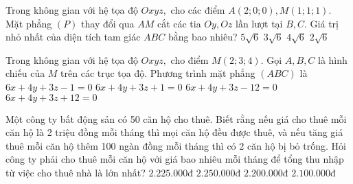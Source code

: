 \begin{ex}%
Trong không gian với hệ tọa độ $Oxyz,$ cho các điểm $A(2; 0; 0), M(1; 1; 1).$ Mặt phẳng $(P)$ thay đổi qua $AM$ cắt các tia $Oy, Oz$ lần lượt tại $B, C$. Giá trị nhỏ nhất của diện tích tam giác $ABC$ bằng bao nhiêu?
\choice
{$5\sqrt6$}
{$3\sqrt6$}
{\True $4\sqrt6$}
{$2\sqrt6$}
\end{ex}

\begin{ex}%
Trong không gian với hệ tọa độ $Oxyz,$ cho điểm $M(2; 3; 4).$ Gọi $A, B, C$ là hình chiếu của $M$ trên các trục tọa độ. Phương trình mặt phẳng $(ABC)$ là
\choice
{$6x+4y+3z-1=0$}
{$6x+4y+3z+1=0$}
{\True $6x+4y+3z-12=0$}
{$6x+4y+3z+12=0$}
\end{ex}

\begin{ex}%
Một công ty bất động sản có 50 căn hộ cho thuê. Biết rằng nếu giá cho thuê mỗi căn hộ là 2 triệu đồng mỗi tháng thì mọi căn hộ đều được thuê, và nếu tăng giá thuê mỗi căn hộ thêm 100 ngàn đồng mỗi tháng thì có 2 căn hộ bị bỏ trống. Hỏi công ty phải cho thuê mỗi căn hộ với giá bao nhiêu mỗi tháng để tổng thu nhập từ việc cho thuê nhà là lớn nhất?
\choice
{$2.225.000$đ}
{\True $2.250.000$đ}
{$2.200.000$đ}
{$2.100.000$đ}
\end{ex}


